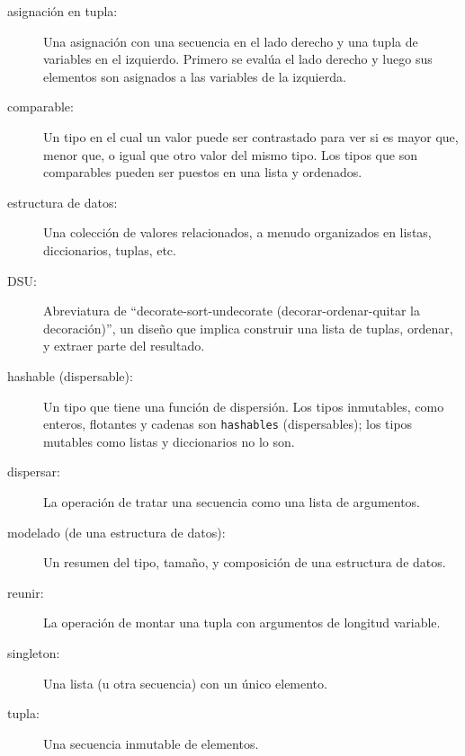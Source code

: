 \begin{description}

\item[asignación en tupla:] Una asignación con una secuencia en el
lado derecho y una tupla de variables en el izquierdo. Primero
se evalúa el lado derecho y luego sus elementos son asignados a las
variables de la izquierda.

\item[comparable:] Un tipo en el cual un valor puede ser contrastado para ver si es
mayor que, menor que, o igual que otro valor del mismo tipo.
Los tipos que son comparables pueden ser puestos en una lista y ordenados.

\item[estructura de datos:] Una colección de valores relacionados, a menudo
organizados en listas, diccionarios, tuplas, etc.

\item[DSU:] Abreviatura de ``decorate-sort-undecorate
(decorar-ordenar-quitar la decoración)'',
un diseño que implica construir una lista de tuplas, ordenar, y
extraer parte del resultado.

\item[hashable (dispersable):] Un tipo que tiene una función de dispersión. Los tipos
inmutables, como enteros,
flotantes y cadenas son {\tt hashables} (dispersables); los tipos mutables como listas y
diccionarios no lo son.

\item[dispersar:] La operación de tratar una secuencia como una lista de
argumentos.

\item[modelado (de una estructura de datos):] Un resumen del tipo,
tamaño, y composición de una estructura de datos.

\item[reunir:] La operación de montar una tupla
con argumentos de longitud variable.

\item[singleton:] Una lista (u otra secuencia) con un único elemento.

\item[tupla:] Una secuencia inmutable de elementos.

\end{description}



